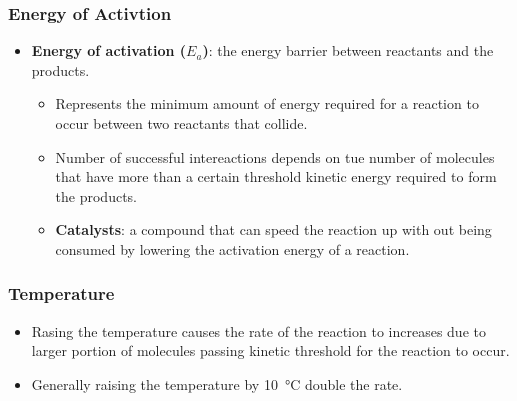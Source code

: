 \documentclass[12pt,a4paper]{article}
\begin{document}
\begin{itemize}
    \subsubsection{Energy of Activtion}
    \begin{itemize}
        \item \textbf{Energy of activation (\(E_a\))}: the energy barrier between reactants and the products.
            \begin{itemize}
                \item Represents the minimum amount of energy required for a reaction to occur between two reactants that collide.
                \item Number of successful intereactions depends on tue number of molecules that have more than a certain threshold kinetic energy required to form the products.
                \item \textbf{Catalysts}: a compound that can speed the reaction up with out being consumed by lowering the activation energy of a reaction.
            \end{itemize}
    \end{itemize}
    \subsubsection{Temperature}
    \begin{itemize}
        \item Rasing the temperature causes the rate of the reaction to increases due to larger portion of molecules passing kinetic threshold for the reaction to occur.
        \item Generally raising the temperature by \SI{10}{\celsius} double the rate.
    \end{itemize} 
\end{itemize}
\end{document}
